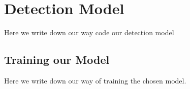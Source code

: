 \section{Detection Model}
\label{sec:detection_model}

Here we write down our way code our detection model

\subsection{Training our Model}
Here we write down our way of training the chosen model.